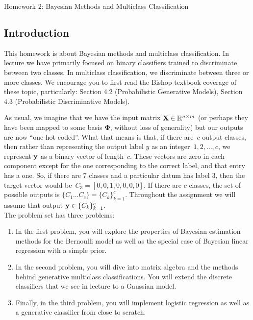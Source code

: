 \documentclass[submit]{harvardml}
\begin{document}
{
  \begin{center}
{\Large Homework 2: Bayesian Methods and Multiclass Classification}\\
\end{center}
}
\subsection*{Introduction}


This homework is about Bayesian methods and multiclass
classification. In lecture we have primarily focused on binary
classifiers trained to discriminate between two classes. In multiclass
classification, we discriminate between three or more classes. We
encourage you to first read the Bishop textbook coverage of these
topic, particularly: Section 4.2 (Probabilistic Generative Models),
Section 4.3 (Probabilistic Discriminative Models).

As usual, we imagine that we have the input matrix $\mathbf{X} \in
\mathbb{R}^{n \times m}$ (or perhaps they have been mapped to some basis
$\bm{\Phi}$, without loss of generality) but our outputs are now
``one-hot coded''.  What that means is that, if there are~$c$ output
classes, then rather than representing the output label $y$ as an
integer~${1,2,\ldots,c}$, we represent $\mathbf{y}$ as a binary vector of
length~$c$. These vectors are zero in each component except for the
one corresponding to the correct label, and that entry has a one.  So,
if there are 7 classes and a particular datum has label 3, then the
target vector would be~${C_3 = [0,0,1,0,0,0,0]}$.  If there are $c$
classes, the set of possible outputs is $\{C_1 \ldots C_c \} =
\{C_k\}_{k=1}^c$.  Throughout the assignment we will assume that
output $\mathbf{y} \in \{C_k\}_{k=1}^c$.\\

The problem set has three problems:
\begin{enumerate}
\item In the first problem, you will explore the properties of
  Bayesian estimation methods for the Bernoulli model as well as the
  special case of Bayesian linear regression with a simple prior.
%
\item In the second problem, you will dive into matrix algebra and the
  methods behind generative multiclass classifications. You will
  extend the discrete classifiers that we see in lecture to a Gaussian
  model.
%
\item Finally, in the third problem, you will implement logistic
  regression as well as a generative classifier from close to scratch.
%
\end{enumerate}
\end{document}
